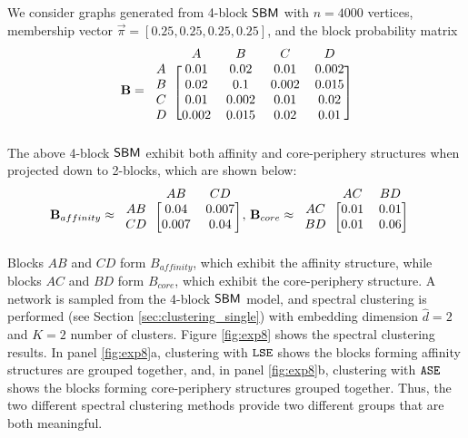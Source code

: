 We consider graphs generated from 4-block $\operatorname{\mathsf{SBM}}$ with $n=4000$ vertices, membership vector $\vec{\pi} = [0.25, 0.25, 0.25, 0.25]$, and the block probability matrix
\begin{align*}
    \mathbf{B} = 
    \begin{blockarray}{ccccc}
        & A & B & C & D \\
        \begin{block}{c[cccc]}
        A & 0.01 & 0.02  & 0.01   & 0.002 \\
        B & 0.02 & 0.1   & 0.002  & 0.015  \\
        C & 0.01 & 0.002 & 0.01  & 0.02 \\
        D & 0.002 & 0.015 & 0.02 & 0.01 \\
        \end{block}
    \end{blockarray}
\end{align*}
The above 4-block $\operatorname{\mathsf{SBM}}$ exhibit both affinity and core-periphery structures when projected down to 2-blocks, which are shown below:
\begin{align*}
    \mathbf{B}_{affinity} \approx 
    \begin{blockarray}{ccc}
        & AB & CD  \\
        \begin{block}{c[cc]}
        AB & 0.04 & 0.007  \\
        CD & 0.007 & 0.04  \\
        \end{block}
    \end{blockarray},~ &
    \mathbf{B}_{core} \approx
    \begin{blockarray}{ccc}
        & AC & BD  \\
        \begin{block}{c[cc]}
        AC & 0.01 & 0.01  \\
        BD & 0.01 & 0.06  \\
        \end{block}
    \end{blockarray}
\end{align*} 
Blocks $AB$ and $CD$ form $B_{affinity}$, which exhibit the affinity structure, while blocks $AC$ and $BD$ form $B_{core}$, which exhibit the core-periphery structure. 
A network is sampled from the 4-block $\operatorname{\mathsf{SBM}}$ model, and spectral clustering is performed (see Section \ref{sec:clustering_single}) with embedding dimension $\hat d=2$ and $K=2$ number of clusters. Figure \ref{fig:exp8} shows the spectral clustering results. In panel \ref{fig:exp8}a, clustering with $\operatorname{\mathtt{LSE}}$ shows the blocks forming affinity structures are grouped together, and, in panel \ref{fig:exp8}b, clustering with $\operatorname{\mathtt{ASE}}$ shows the blocks forming core-periphery structures grouped together. Thus, the two different spectral clustering methods provide two different groups that are both meaningful. 

